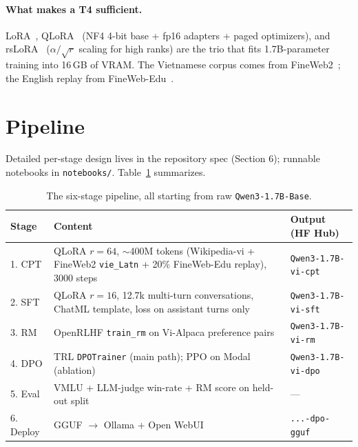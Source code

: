 \documentclass[10pt,twocolumn]{article}
\begin{document}
\paragraph{What makes a T4 sufficient.}
LoRA~\citep{hu2021lora}, QLoRA~\citep{dettmers2023qlora} (NF4 4-bit base + fp16 adapters + paged optimizers), and rsLoRA~\citep{kalajdzievski2023rslora} ($\alpha/\sqrt{r}$ scaling for high ranks) are the trio that fits 1.7B-parameter training into 16\,GB of VRAM. The Vietnamese corpus comes from FineWeb2~\citep{penedo2025fineweb2}; the English replay from FineWeb-Edu~\citep{penedo2024fineweb}.

\section{Pipeline}
\label{sec:pipeline}

Detailed per-stage design lives in the repository spec (Section 6); runnable notebooks in \texttt{notebooks/}. Table~\ref{tab:pipeline} summarizes.

\begin{table}[t]
\centering\small
\caption{The six-stage pipeline, all starting from raw \texttt{Qwen3-1.7B-Base}.}
\label{tab:pipeline}
\begin{tabularx}{\textwidth}{@{}lXl@{}}
\toprule
\textbf{Stage} & \textbf{Content} & \textbf{Output (HF Hub)} \\
\midrule
1. CPT & QLoRA $r{=}64$, $\sim$400M tokens (Wikipedia-vi + FineWeb2 \texttt{vie\_Latn} + 20\% FineWeb-Edu replay), 3000 steps & \texttt{Qwen3-1.7B-vi-cpt} \\
2. SFT & QLoRA $r{=}16$, 12.7k multi-turn conversations, ChatML template, loss on assistant turns only & \texttt{Qwen3-1.7B-vi-sft} \\
3. RM & OpenRLHF \texttt{train\_rm} on Vi-Alpaca preference pairs & \texttt{Qwen3-1.7B-vi-rm} \\
4. DPO & TRL \texttt{DPOTrainer} (main path); PPO on Modal (ablation) & \texttt{Qwen3-1.7B-vi-dpo} \\
5. Eval & VMLU + LLM-judge win-rate + RM score on held-out split & --- \\
6. Deploy & GGUF $\to$ Ollama + Open WebUI & \texttt{...-dpo-gguf} \\
\bottomrule
\end{tabularx}
\end{table}
\end{document}
